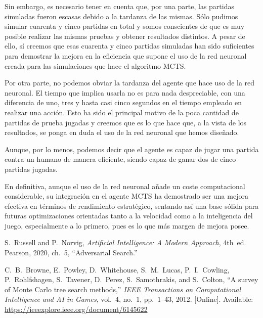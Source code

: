 \documentclass[conference]{IEEEtran}
\begin{document}
Sin embargo, es necesario tener en cuenta que, por una parte, las partidas simuladas fueron escasas debido a la tardanza de las mismas. Sólo pudimos simular cuarenta y cinco partidas en total y somos conscientes de que es muy posible realizar las mismas pruebas y obtener resultados distintos. A pesar de ello, sí creemos que esas cuarenta y cinco partidas simuladas han sido suficientes para demostrar la mejora en la eficiencia que supone el uso de la red neuronal creada para las simulaciones que hace el algoritmo MCTS.

Por otra parte, no podemos obviar la tardanza del agente que hace uso de la red neuronal. El tiempo que implica usarla no es para nada despreciable, con una diferencia de uno, tres y hasta casi cinco segundos en el tiempo empleado en realizar una acción. Esto ha sido el principal motivo de la poca cantidad de partidas de prueba jugadas y creemos que es lo que hace que, a la vista de los resultados, se ponga en duda el uso de la red neuronal que hemos diseñado.

Aunque, por lo menos, podemos decir que el agente es capaz de jugar una partida contra un humano de manera eficiente, siendo capaz de ganar dos de cinco partidas jugadas.

En definitiva, aunque el uso de la red neuronal añade un coste computacional considerable, su integración en el agente MCTS ha demostrado ser una mejora efectiva en términos de rendimiento estratégico, sentando así una base sólida para futuras optimizaciones orientadas tanto a la velocidad como a la inteligencia del juego, especialmente a lo primero, pues es lo que más margen de mejora posee.

\begin{thebibliography}{99}

S.~Russell and P.~Norvig, \emph{Artificial Intelligence: A Modern Approach}, 4th~ed. Pearson, 2020, ch.~5, ``Adversarial Search.''

C.~B.~Browne, E.~Powley, D.~Whitehouse, S.~M.~Lucas, P.~I.~Cowling, P.~Rohlfshagen, S.~Tavener, D.~Perez, S.~Samothrakis, and S.~Colton, ``A survey of Monte Carlo tree search methods,'' \emph{IEEE Transactions on Computational Intelligence and AI in Games}, vol.~4, no.~1, pp.~1--43, 2012. [Online]. Available: \url{https://ieeexplore.ieee.org/document/6145622}

\end{thebibliography}


\end{document}
